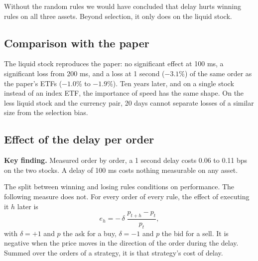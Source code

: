 \documentclass[11pt]{article}
\newcommand{\keyfinding}[1]{%
  \begingroup\setlength{\fboxsep}{9pt}%
  \noindent\colorbox{boxbg}{\parbox{\dimexpr\linewidth-2\fboxsep\relax}{\textbf{\color{accent}Key finding.} #1}}%
  \endgroup\par\vspace{0.5em}}
\begin{document}
Without the random rules we would have concluded that delay hurts winning rules on
all three assets. Beyond selection, it only does on the liquid stock.

\subsection{Comparison with the paper}
\label{sec:paper}

\begin{table}[H]
  \centering
  \small
  \caption{Importance of speed (\%) for rules with a positive return. Paper:
  Table B.1 of its internet appendix (186 days, 27{,}424 rules). A star marks a
  loss that is significant against the selection bias.}
  \label{tab:paper}
  
\end{table}

The liquid stock reproduces the paper: no significant effect at 100 ms, a
significant loss from 200 ms, and a loss at 1 second ($-3.1\%$) of the same order
as the paper's ETFs ($-1.0\%$ to $-1.9\%$). Ten years later, and on a single stock
instead of an index ETF, the importance of speed has the same shape. On the less
liquid stock and the currency pair, 20 days cannot separate losses of a similar
size from the selection bias.

\subsection{Effect of the delay per order}
\label{sec:order}

\keyfinding{Measured order by order, a 1 second delay costs 0.06 to 0.11 bps on
the two stocks. A delay of 100 ms costs nothing measurable on any asset.}

The split between winning and losing rules conditions on performance. The
following measure does not. For every order of every rule, the effect of executing
it $h$ later is
\[
  e_h = -\,\delta\;\frac{p_{t+h} - p_t}{p_t},
\]
with $\delta = +1$ and $p$ the ask for a buy, $\delta = -1$ and $p$ the bid for a
sell. It is negative when the price moves in the direction of the order during the
delay. Summed over the orders of a strategy, it is that strategy's cost of delay.

\begin{table}[H]
  \centering
  \small
  \caption{Effect of the delay per order, in bps of the price, over the 601 rules.
  Intervals resample trading days, which keeps the dependence between rules that
  trade at the same instant. A star marks a 90\% interval that excludes zero.}
  \label{tab:order}
  
\end{table}
\end{document}
